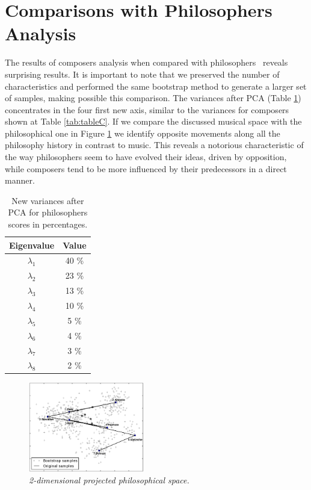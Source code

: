 \documentclass[
 aip,
 jmp,
 amsmath,amssymb,
 reprint,
]{revtex4-1}
\begin{document}
\section{Comparisons with Philosophers Analysis}

The results of composers analysis when compared with philosophers~\cite{Fabbri}
reveals surprising results. It is important to note that we preserved the
number of characteristics and performed the same bootstrap method to
generate a larger set of samples, making possible this
comparison. The variances after PCA (Table \ref{tab:varphi}) concentrates in the four
first new axis, similar to the variances for composers shown at Table \ref{tab:tableC}. If we compare the discussed musical space
with the philosophical one in Figure \ref{fig:phipca} we
identify opposite movements along all the philosophy history in contrast
to music. This reveals a notorious characteristic of the way
philosophers seem to have evolved their ideas, driven by opposition, while
composers tend to be more influenced by their predecessors in a direct manner.

\begin{table}[ht]
\caption{\label{tab:varphi}New variances after PCA for philosophers
  scores in percentages.}

\begin{tabular}{|c||c|}
\hline
Eigenvalue  & Value     \\ \hline

$\lambda_1$ &  40 \% \\
$\lambda_2$ &  23 \% \\
$\lambda_3$ &  13 \% \\
$\lambda_4$ &  10 \% \\
$\lambda_5$ &   5 \% \\
$\lambda_6$ &   4 \% \\
$\lambda_7$ &   3 \% \\
$\lambda_8$ &   2 \% \\
\hline

\end{tabular}
\end{table}

\begin{figure}
  \begin{center}
    \includegraphics[width=0.45\textwidth]{g1filosofos}
  \end{center}
  \caption{\it 2-dimensional projected philosophical space.}
  \label{fig:phipca}
\end{figure}
\end{document}
